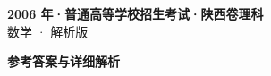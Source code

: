 \documentclass[zihao=-4, a4paper]{ctexart}
\begin{document}
\begin{center}
  {\Large\bfseries 2006 年·普通高等学校招生考试·陕西卷理科}\\[4pt]
  {\large 数学 · 解析版}
\end{center}
\medskip
{}

\clearpage
{}
\begin{center}{\Large\bfseries 参考答案与详细解析}\end{center}
\medskip

\end{document}
